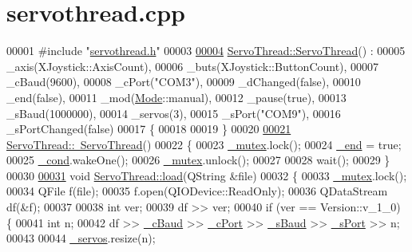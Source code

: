 \hypertarget{a00019_source}{}\section{servothread.\+cpp}

\begin{DoxyCode}
00001 \textcolor{preprocessor}{#include "\hyperlink{a00020}{servothread.h}"}
00003 
\hypertarget{a00019_source_l00004}{}\hyperlink{a00007_af021de9817b11968dd627186e9e05a71}{00004} \hyperlink{a00007_af021de9817b11968dd627186e9e05a71}{ServoThread::ServoThread}() :
00005     \_axis(XJoystick::AxisCount),
00006     \_buts(XJoystick::ButtonCount),
00007     \_cBaud(9600),
00008     \_cPort(\textcolor{stringliteral}{"COM3"}),
00009     \_dChanged(false),
00010     \_end(false),
00011     \_mod(\hyperlink{a00007_a8d581034e60792a9995d44065f6140a5}{Mode}::manual),
00012     \_pause(true),
00013     \_sBaud(1000000),
00014     \_servos(3),
00015     \_sPort(\textcolor{stringliteral}{"COM9"}),
00016     \_sPortChanged(false)
00017 \{
00018     
00019 \}
00020 
\hypertarget{a00019_source_l00021}{}\hyperlink{a00007_a0c7ac1f603a247eac91d9780ad50f5fa}{00021} \hyperlink{a00007_a0c7ac1f603a247eac91d9780ad50f5fa}{ServoThread::~ServoThread}()
00022 \{
00023     \hyperlink{a00007_a6327eafc0dac189ec1b202d63ef32457}{\_mutex}.lock();
00024     \hyperlink{a00007_acca9896d1a2d1ef68527e6834f81c76c}{\_end} = \textcolor{keyword}{true};
00025     \hyperlink{a00007_afcb93c09acd7fecf47d92996a297365c}{\_cond}.wakeOne();
00026     \hyperlink{a00007_a6327eafc0dac189ec1b202d63ef32457}{\_mutex}.unlock();
00027     
00028     wait();
00029 \}
00030 
\hypertarget{a00019_source_l00031}{}\hyperlink{a00007_ae88d0a9c84099ca607c7cf929500fb26}{00031} \textcolor{keywordtype}{void} \hyperlink{a00007_ae88d0a9c84099ca607c7cf929500fb26}{ServoThread::load}(QString &file)
00032 \{
00033     \hyperlink{a00007_a6327eafc0dac189ec1b202d63ef32457}{\_mutex}.lock();
00034     QFile f(file);
00035     f.open(QIODevice::ReadOnly);
00036     QDataStream df(&f);
00037     
00038     \textcolor{keywordtype}{int} ver;
00039     df >> ver;
00040     \textcolor{keywordflow}{if} (ver == Version::v\_1\_0) \{
00041         \textcolor{keywordtype}{int} n;
00042         df >> \hyperlink{a00007_a9fccfd415e2e55c8abef7fcc6535af30}{\_cBaud} >> \hyperlink{a00007_ab52437b31a433c427a6c050f2b1cc959}{\_cPort} >> \hyperlink{a00007_a5b9a41b9e271275b914affb0a845a2ee}{\_sBaud} >> \hyperlink{a00007_ac9a614aa1518efb49b0a06636bd1bdbf}{\_sPort} >> n;
00043         
00044         \hyperlink{a00007_a1ac6662fe6d198b5971ae0ffa7ddfcfd}{\_servos}.resize(n);

\end{DoxyCode}
